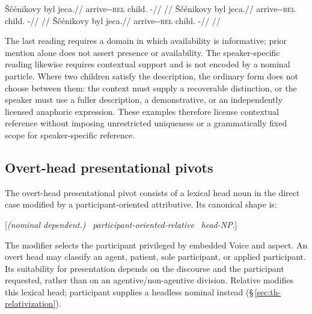 \pex
\a
\begingl
\gla Ščénikovy byl jeca.//
\glb arrive-\Pf{}-\textsc{rel} child.\Dir{} \Exst{}-\Cont{}//
\glft {} //
\endgl
\a
\begingl
\gla Ščénikovy byl jeca.//
\glb arrive-\Pf{}-\textsc{rel} child.\Dir{} \Exst{}-\Cont{}//
\glft {} //
\endgl
\a
\begingl
\gla Ščénikovy byl jeca.//
\glb arrive-\Pf{}-\textsc{rel} child.\Dir{} \Exst{}-\Cont{}//
\glft {} //
\endgl
\xe

The last reading requires a domain in which availability is informative;
prior mention alone does not assert presence or availability. The
speaker-specific reading likewise requires contextual support and is not
encoded by a nominal particle. Where two children satisfy the description,
the ordinary form does not choose between them: the context must supply a
recoverable distinction, or the speaker must use a fuller description,
a demonstrative, or an independently licensed anaphoric expression. These
examples therefore license contextual reference without imposing unrestricted
uniqueness or a grammatically fixed scope for speaker-specific reference.

\subsection{Overt-head presentational pivots}
\label{sec:exst-overt-head}

The overt-head presentational pivot consists of a lexical head noun in the direct
case modified by a participant-oriented attributive. Its canonical shape is:

\begin{center}
[\textit{(nominal dependent.\Ind{})} \ \textit{participant-oriented-relative} \ \textit{head-NP}.\Dir{}] \ \ 
\end{center}

The modifier selects the participant privileged by embedded Voice and aspect.
An overt head may classify an agent, patient, sole participant, or applied
participant. Its suitability for presentation depends on the discourse and
the participant requested, rather than on an agentive/non-agentive division.
Relative  modifies this lexical head; participant 
supplies a headless nominal instead (§\,\ref{sec:th-relativization}).

